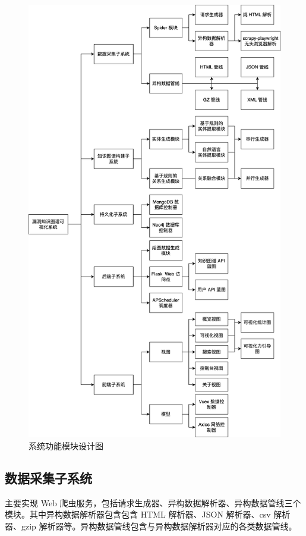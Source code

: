 \documentclass[a4paper,AutoFakeBold,oneside,12pt]{book}
\begin{document}
\begin{figure}
	\includegraphics[height=0.97\textheight]{pictures/CyKG_OrgChart-中文.png}
	\caption{系统功能模块设计图}
	\label{CyKG_OrgChart}
\end{figure}

\subsection{数据采集子系统}

主要实现 Web 爬虫服务，包括请求生成器、异构数据解析器、异构数据管线三个模块。其中异构数据解析器包含包含 HTML 解析器、JSON 解析器、csv 解析器、gzip 解析器等。异构数据管线包含与异构数据解析器对应的各类数据管线。
\end{document}
